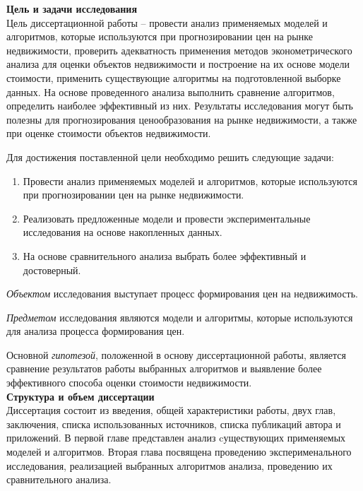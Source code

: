 \label{sec:general_description}

\textbf{Цель и задачи исследования}\\

Цель диссертационной работы – провести анализ применяемых моделей и алгоритмов, которые используются при
прогнозировании цен на рынке недвижимости, проверить адекватность применения методов эконометрического
анализа для оценки объектов недвижимости и построение на их основе модели стоимости, применить существующие алгоритмы на
подготовленной выборке данных.
На основе проведенного анализа выполнить сравнение алгоритмов, определить наиболее эффективный из них.
Результаты исследования могут быть полезны для прогнозирования
ценообразования на рынке недвижимости, а также при оценке стоимости объектов недвижимости.

Для достижения поставленной цели необходимо решить следующие задачи:
\begin{enumerate}
  \item Провести анализ применяемых моделей и алгоритмов, которые используются при прогнозировании цен на рынке недвижимости.
  \item Реализовать предложенные модели и провести экспериментальные исследования на основе накопленных данных.
  \item На основе сравнительного анализа выбрать более эффективный и достоверный.
\end{enumerate}

\textit{Объектом} исследования выступает процесс формирования цен \linebreak на недвижимость.

\textit{Предметом} исследования являются модели и алгоритмы, которые используются для анализа процесса формирования цен.

Основной \textit{гипотезой}, положенной в основу диссертационной работы, является сравнение результатов работы выбранных алгоритмов
и выявление более эффективного способа оценки стоимости недвижимости.
~\\

\textbf{Структура и объем диссертации}\\

Диссертация состоит из введения, общей характеристики работы, двух глав, заключения, списка использованных источников,
списка публикаций автора и приложений. В первой главе представлен анализ cуществующих применяемых моделей и алгоритмов.
Вторая глава посвящена проведению эксперименального исследования, реализацией выбранных алгоритмов анализа, проведению
их сравнительного анализа.
